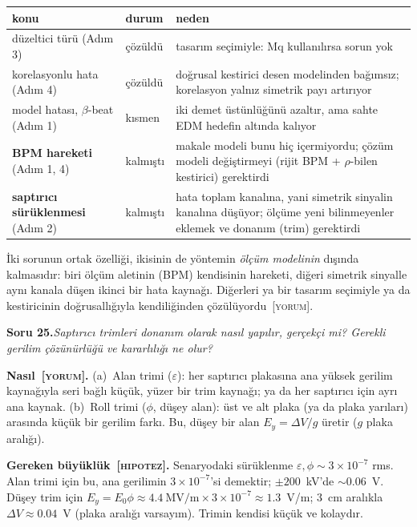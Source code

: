 \documentclass[11pt,a4paper]{article}
\newcommand{\YOR}{\textsc{[yorum]}}
\newcommand{\HIP}{\textsc{[hipotez]}}
\newcounter{soru}
\newcommand{\soru}[2]{%
  \par\medskip\noindent\textbf{Soru #1.}\enspace\textit{#2}\par\nopagebreak\smallskip}
\begin{document}
\begin{center}\small
\begin{tabularx}{\textwidth}{>{\raggedright\arraybackslash}p{3.6cm}>{\raggedright\arraybackslash}p{1.6cm}>{\raggedright\arraybackslash}X}
\toprule
konu & durum & neden \\
\midrule
düzeltici türü (Adım 3) & çözüldü & tasarım seçimiyle: Mq kullanılırsa sorun yok \\
korelasyonlu hata (Adım 4) & çözüldü & doğrusal kestirici desen modelinden bağımsız; korelasyon yalnız simetrik payı artırıyor \\
model hatası, $\beta$-beat (Adım 1) & kısmen & iki demet üstünlüğünü azaltır, ama sahte EDM hedefin altında kalıyor \\
\textbf{BPM hareketi} (Adım 1, 4) & kalmıştı & makale modeli bunu hiç içermiyordu; çözüm modeli değiştirmeyi (rijit BPM + $\rho$-bilen kestirici) gerektirdi \\
\textbf{saptırıcı sürüklenmesi} (Adım 2) & kalmıştı & hata toplam kanalına, yani simetrik sinyalin kanalına düşüyor; ölçüme yeni bilinmeyenler eklemek ve donanım (trim) gerektirdi \\
\bottomrule
\end{tabularx}
\end{center}
İki sorunun ortak özelliği, ikisinin de yöntemin \emph{ölçüm modelinin} dışında kalmasıdır: biri ölçüm aletinin
(BPM) kendisinin hareketi, diğeri simetrik sinyalle aynı kanala düşen ikinci bir hata kaynağı. Diğerleri
ya bir tasarım seçimiyle ya da kestiricinin doğrusallığıyla kendiliğinden çözülüyordu~\YOR.

\soru{25}{Saptırıcı trimleri donanım olarak nasıl yapılır, gerçekçi mi? Gerekli gerilim çözünürlüğü ve
kararlılığı ne olur?}

\textbf{Nasıl~\YOR.} (a)~Alan trimi ($\varepsilon$): her saptırıcı plakasına ana yüksek gerilim kaynağıyla
seri bağlı küçük, yüzer bir trim kaynağı; ya da her saptırıcı için ayrı ana kaynak. (b)~Roll trimi
($\phi$, düşey alan): üst ve alt plaka (ya da plaka yarıları) arasında küçük bir gerilim farkı. Bu, düşey
bir alan $E_y=\Delta V/g$ üretir ($g$ plaka aralığı).

\textbf{Gereken büyüklük~\HIP.} Senaryodaki sürüklenme $\varepsilon,\phi\sim3\times10^{-7}$ rms. Alan trimi
için bu, ana gerilimin $3\times10^{-7}$'si demektir; $\pm200$~kV'de $\sim0.06$~V. Düşey trim için
$E_y=E_0\phi\approx4.4~\text{MV/m}\times3\times10^{-7}\approx1.3$~V/m; 3~cm aralıkla $\Delta V\approx0.04$~V
(plaka aralığı varsayım). Trimin kendisi küçük ve kolaydır.
\end{document}
